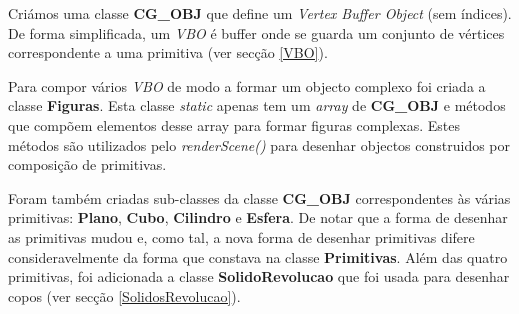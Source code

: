 \documentclass[a5paper,onecolumn, 11pt]{article}
\begin{document}
Criámos uma classe \textbf{CG\_OBJ} que define um \textit{Vertex Buffer Object} (sem índices). De forma simplificada, um \textit{VBO} é buffer onde se guarda um conjunto de vértices correspondente a uma primitiva (ver secção \ref{VBO}).

Para compor vários \textit{VBO} de modo a formar um objecto complexo foi criada a classe \textbf{Figuras}. Esta classe \textit{static} apenas tem um \textit{array} de \textbf{CG\_OBJ} e métodos que compõem elementos desse array para formar figuras complexas. Estes métodos são utilizados pelo \textit{renderScene()} para desenhar objectos construidos por composição de primitivas.

Foram também criadas sub-classes da classe \textbf{CG\_OBJ} correspondentes às várias primitivas: \textbf{Plano}, \textbf{Cubo}, \textbf{Cilindro} e \textbf{Esfera}. De notar que a forma de desenhar as primitivas mudou e, como tal, a nova forma de desenhar primitivas difere consideravelmente da forma que constava na classe \textbf{Primitivas}. Além das quatro primitivas, foi adicionada a classe \textbf{SolidoRevolucao} que foi usada para desenhar copos (ver secção \ref{SolidosRevolucao}).
\end{document}
